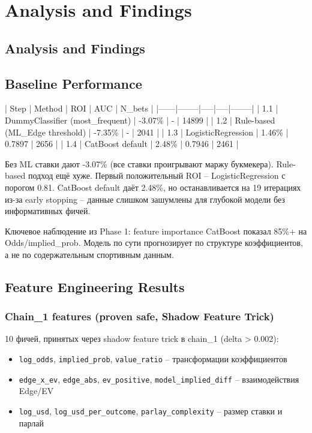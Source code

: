 \documentclass[12pt,a4paper]{article}
\begin{document}
\section{Analysis and Findings}

\subsection{Analysis and Findings}

\subsection{Baseline Performance}

| Step | Method | ROI | AUC | N\_bets |
|------|--------|-----|-----|--------|
| 1.1 | DummyClassifier (most\_frequent) | -3.07\% | - | 14899 |
| 1.2 | Rule-based (ML\_Edge threshold) | -7.35\% | - | 2041 |
| 1.3 | LogisticRegression | 1.46\% | 0.7897 | 2656 |
| 1.4 | CatBoost default | 2.48\% | 0.7946 | 2461 |

Без ML ставки дают -3.07\% (все ставки проигрывают маржу букмекера). Rule-based подход ещё хуже. Первый положительный ROI -- LogisticRegression с порогом 0.81. CatBoost default даёт 2.48\%, но останавливается на 19 итерациях из-за early stopping -- данные слишком зашумлены для глубокой модели без информативных фичей.

Ключевое наблюдение из Phase 1: feature importance CatBoost показал 85\%+ на Odds/implied\_prob. Модель по сути прогнозирует по структуре коэффициентов, а не по содержательным спортивным данным.

\subsection{Feature Engineering Results}

\subsubsection{Chain\_1 features (proven safe, Shadow Feature Trick)}
10 фичей, принятых через shadow feature trick в chain\_1 (delta > 0.002):
\begin{itemize}
  \item \texttt{log\_odds}, \texttt{implied\_prob}, \texttt{value\_ratio} -- трансформации коэффициентов
  \item \texttt{edge\_x\_ev}, \texttt{edge\_abs}, \texttt{ev\_positive}, \texttt{model\_implied\_diff} -- взаимодействия Edge/EV
  \item \texttt{log\_usd}, \texttt{log\_usd\_per\_outcome}, \texttt{parlay\_complexity} -- размер ставки и парлай
\end{itemize}
\end{document}
